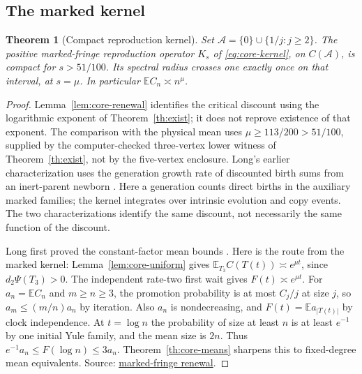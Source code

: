 \documentclass[11pt]{article}
\newcommand{\proofsrc}[2]{\href{https://github.com/uzay-eth/friend-tree-exponent/blob/a0972085ad72ad5685ae7b424988648d1965e73c/#1}{#2}}
\newtheorem{theorem}{Theorem}
\newcommand{\resulttag}{?}
\newcommand{\tagnext}[1]{\renewcommand{\resulttag}{#1}}
\theoremstyle{remark}
\numberwithin{equation}{section}
\newcommand{\E}{\mathbb E}
\begin{document}
\subsection{The marked kernel}
\tagnext{KER}
\begin{theorem}[Compact reproduction kernel]\label{th:core-kernel}
Set $\mathcal A=\{0\}\cup\{1/j:j\ge2\}$. The positive marked-fringe reproduction operator $K_s$ of \eqref{eq:core-kernel}, on $C(\mathcal A)$, is compact for $s>51/100$. Its spectral radius crosses one exactly once on that interval, at $s=\mu$. In particular $\mathbb E C_n\asymp n^\mu$.
\end{theorem}
\begin{proof}
Lemma~\ref{lem:core-renewal} identifies the critical discount using the logarithmic exponent of Theorem~\ref{th:exist}; it does not reprove existence of that exponent. The comparison with the physical mean uses $\mu\ge113/200>51/100$, supplied by the computer-checked three-vertex lower witness of Theorem~\ref{th:exist}, not by the five-vertex enclosure. Long's earlier characterization uses the generation growth rate of discounted birth sums from an inert-parent newborn \cite{LongKernel}. Here a generation counts direct births in the auxiliary marked families; the kernel integrates over intrinsic evolution and copy events. The two characterizations identify the same discount, not necessarily the same function of the discount.

Long first proved the constant-factor mean bounds \cite{LongMean}. Here is the route from the marked kernel: Lemma~\ref{lem:core-uniform} gives $\E_{T_3}C(T(t))\asymp e^{\mu t}$, since $d_2\Psi(T_3)>0$. The independent rate-two first wait gives $F(t)\asymp e^{\mu t}$. For $a_n=\E C_n$ and $m\ge n\ge3$, the promotion probability is at most $C_j/j$ at size $j$, so $a_m\le (m/n)a_n$ by iteration. Also $a_n$ is nondecreasing, and $F(t)=\E a_{|T(t)|}$ by clock independence. At $t=\log n$ the probability of size at least $n$ is at least $e^{-1}$ by one initial Yule family, and the mean size is $2n$. Thus $e^{-1}a_n\le F(\log n)\le3a_n$. Theorem~\ref{th:core-means} sharpens this to fixed-degree mean equivalents. Source: \proofsrc{round2/proofs/astra/source/round2/fringe/renewal.md}{marked-fringe renewal}.
\end{proof}
\end{document}
